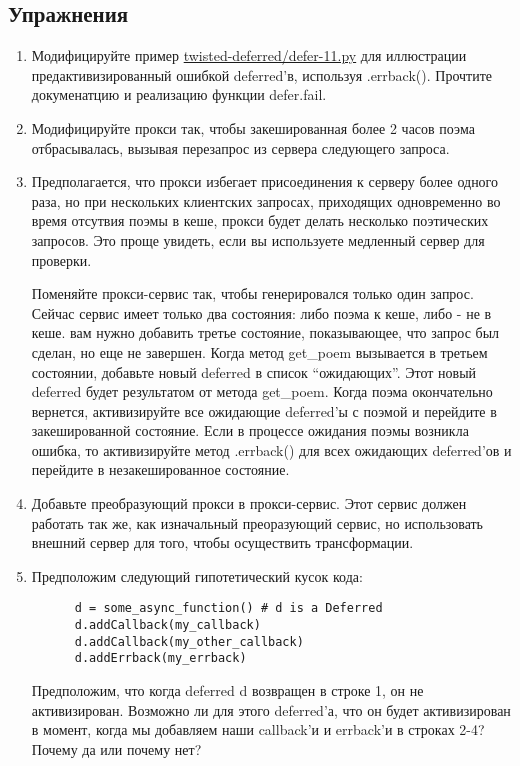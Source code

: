 \subsection{Упражнения}


\begin{enumerate}

\item Модифицируйте пример 
\href{http://github.com/jdavisp3/twisted-intro/blob/master/twisted-deferred/defer-11.py#L1}{twisted-deferred/defer-11.py} для иллюстрации предактивизированный ошибкой deferred'в, 
используя .errback(). Прочтите докуменатцию и реализацию функции defer.fail.

\item Модифицируйте прокси так, чтобы закешированная более 2 часов поэма отбрасывалась, 
вызывая перезапрос из сервера следующего запроса.

\item Предполагается, что прокси избегает присоединения к серверу более 
одного раза, но при нескольких клиентских запросах, приходящих 
одновременно во время отсутвия поэмы в кеше, прокси будет делать 
несколько поэтических запросов. Это проще увидеть, если вы используете 
медленный сервер для проверки. 

Поменяйте прокси-сервис так, 
чтобы генерировался только один запрос. Сейчас 
сервис имеет только два состояния: либо поэма к кеше, либо - не в кеше. 
вам нужно добавить третье состояние, показывающее, что запрос был сделан, 
но еще не завершен. Когда метод get\_poem вызывается в третьем состоянии, 
добавьте новый deferred в список ``ожидающих''. Этот новый deferred 
будет результатом от метода get\_poem. Когда поэма окончательно 
вернется, активизируйте все ожидающие deferred'ы с поэмой и 
перейдите в закешированной состояние. Если в процессе ожидания поэмы 
возникла ошибка, то активизируйте метод .errback() для 
всех ожидающих deferred'ов и перейдите в незакешированное состояние.  

\item Добавьте преобразующий прокси в прокси-сервис. Этот сервис должен 
работать так же, как изначальный преоразующий сервис, но использовать 
внешний сервер для того, чтобы осуществить трансформации. 

\item Предположим следующий гипотетический кусок кода:

 \begin{verbatim}
      d = some_async_function() # d is a Deferred
      d.addCallback(my_callback)
      d.addCallback(my_other_callback)
      d.addErrback(my_errback)
\end{verbatim} 

Предположим, что когда deferred d возвращен в строке 1, 
он не активизирован. Возможно ли для этого deferred'а, что 
он будет активизирован в момент, когда мы добавляем наши 
callback'и и errback'и в строках 2-4? Почему да или почему нет?

\end{enumerate}

